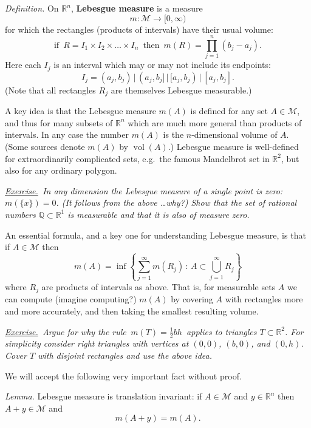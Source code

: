 \documentclass[12pt]{article}
\newcommand{\cM}{\mathcal{M}}
\newcommand{\QQ}{\mathbb{Q}}
\newcommand{\RR}{\mathbb{R}}
\newcommand{\defin}{\emph{Definition.}\,\,}
\newcommand{\lem}{\emph{Lemma.}\,\,}
\newcommand{\exer}[2]{\emph{\underline{Exercise.}\, #2} \vspace*{#1mm}}
\begin{document}
\defin On $\RR^n$, \textbf{Lebesgue measure} is a measure
	$$m : \cM \to [0,\infty)$$
for which the rectangles (products of intervals) have their usual volume:
	$$\text{if }\, R = I_1\times I_2 \times \dots \times I_n \, \text{ then } \, m(R) = \prod_{j=1}^n (b_j - a_j).$$
Here each $I_j$ is an interval which may or may not include its endpoints:
	$$I_j = (a_j,b_j) \,\Big|\, (a_j,b_j] \,\Big|\, [a_j,b_j) \,\Big|\, [a_j,b_j].$$
(Note that all rectangles $R_j$ are themselves Lebesgue measurable.)

A key idea is that the Lebesgue measure $m(A)$ is defined for any set $A\in\cM$, and thus for many subsets of $\RR^n$ which are much more general than products of intervals.  In any case the number $m(A)$ is the $n$-dimensional volume of $A$.  (Some sources denote $m(A)$ by $\operatorname{vol}(A)$.)  Lebesgue measure is well-defined for extraordinarily complicated sets, e.g.~the famous Mandelbrot set in $\RR^2$, but also for any ordinary polygon.

\exer{50}{In any dimension the Lebesgue measure of a single point is zero: $m(\{x\})=0$.  (It follows from the above \dots why?)  Show that the set of rational numbers $\QQ \subset \RR^1$ is measurable and that it is also of measure zero.}

An essential formula, and a key one for understanding Lebesgue measure, is that if $A\in\cM$ then
	$$m(A) = \inf \left\{\sum_{j=1}^\infty m(R_j) \,:\, A \subset \bigcup_{j=1}^\infty R_j\right\}$$
where $R_j$ are products of intervals as above.  That is, for measurable sets $A$ we can compute (imagine computing?) $m(A)$ by covering $A$ with rectangles more and more accurately, and then taking the smallest resulting volume.

\clearpage\newpage
\exer{60}{Argue for why the rule \,$m(T)=\frac{1}{2} b h$\, applies to triangles $T\subset \RR^2$.  For simplicity consider right triangles with vertices at $(0,0)$, $(b,0)$, and $(0,h)$.  Cover $T$ with disjoint rectangles and use the above idea.}

We will accept the following very important fact without proof.

\lem Lebesgue measure is translation invariant: if $A\in \cM$ and $y\in\RR^n$ then $A+y\in\cM$ and
	$$m(A+y) = m(A).$$


\end{document}
